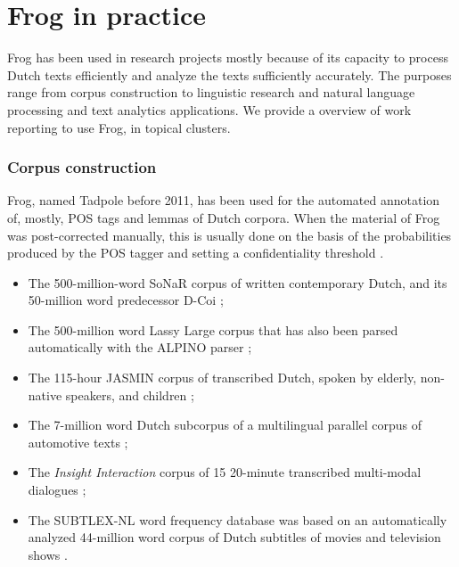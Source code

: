 \documentclass{book}
\begin{document}

\section{Frog in practice}

Frog has been used in research projects mostly because of its capacity to
process Dutch texts efficiently and analyze the texts sufficiently accurately.
The purposes range from corpus construction to linguistic research and natural language processing and text analytics applications. We provide a overview of work reporting to use Frog, in topical clusters.


\subsubsection{Corpus construction}

Frog, named Tadpole before 2011, has been used for the automated annotation of, mostly, POS tags and lemmas of Dutch corpora. When the material of Frog was post-corrected manually, this is usually done on the basis of the probabilities produced by the POS tagger and setting a confidentiality threshold \cite{VandenBosch+06}.

\begin{itemize}
\item The 500-million-word SoNaR corpus of written contemporary Dutch, and its 50-million word predecessor D-Coi \cite{Oostdijk+08,oostdijk2013construction};
\item The 500-million word Lassy Large corpus \cite{van2013large} that has also been parsed automatically with the ALPINO parser \cite{Bouma+01};
\item The 115-hour JASMIN corpus of transcribed Dutch, spoken by elderly, non-native speakers, and children \cite{Cucchiarini+13};
\item The 7-million word Dutch subcorpus of a multilingual parallel corpus of automotive texts \cite{lefever2009language};
\item The {\it Insight Interaction} corpus of 15 20-minute transcribed multi-modal dialogues \cite{brone2015insight};
\item The SUBTLEX-NL word frequency database was based on an automatically analyzed 44-million word corpus of Dutch subtitles of movies and television shows \cite{keuleers2010subtlex}.
\end{itemize}
\end{document}
